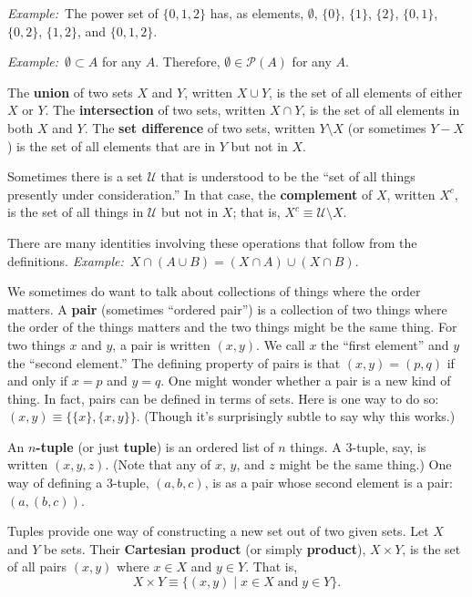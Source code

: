 \documentclass[12pt, a4paper]{article}
\newcommand{\defn}[1]{\textbf{#1}}
\newcommand{\eg}{\emph{Example:}\relax}
\begin{document}
\eg\ The power set of $\{0,1,2\}$ has, as elements, $\emptyset$, $\{0\}$,
$\{1\}$, $\{2\}$, $\{0,1\}$, $\{0,2\}$, $\{1,2\}$, and $\{0,1,2\}$.

\eg\ $\emptyset \subset A$ for any $A$. Therefore, $\emptyset \in \mathcal{P}(A)$ for any $A$. 

The \defn{union} of two sets $X$ and $Y$, written $X \cup Y$, is the set
of all elements of either $X$ or $Y$. The \defn{intersection} of two
sets, written $X \cap Y$, is the set of all elements in both $X$ and
$Y$. The \defn{set difference} of two sets, written $Y \setminus X$ (or
sometimes $Y-X$) is the set of all elements that are in $Y$ but not in
$X$.

Sometimes there is a set $\mathcal{U}$ that is understood to be the “set of all
things presently under consideration.” In that case, the
\defn{complement} of $X$, written $X^c$, is the set of all things in
$\mathcal{U}$ but not in $X$; that is, $X^c \equiv \mathcal{U} \setminus X$.

There are many identities involving these operations that follow from
the definitions.
\eg\ $X\cap(A\cup B) = (X\cap A) \cup (X\cap B)$.

We sometimes do want to talk about collections of things where the
order matters. A \defn{pair} (sometimes “ordered pair”) is a
collection of two things where the order of the things matters and the
two things might be the same thing. For two things $x$ and $y$, a pair
is written $(x, y)$. We call $x$ the “first element” and $y$ the
“second element.” The defining property of pairs is that $(x,y)=(p,q)$
if and only if $x=p$ and $y=q$. One might wonder whether a pair is a
new kind of thing. In fact, pairs can be defined in terms of
sets. Here is one way to do so: $(x, y)\equiv \{\{x\}, \{x,y\}\}$. (Though
it's surprisingly subtle to say why this works.)

An \defn{$n$-tuple} (or just \defn{tuple}) is an ordered list of $n$
things. A 3-tuple, say, is written $(x, y, z)$. (Note that any of $x$,
$y$, and $z$ might be the same thing.) One way of defining a 3-tuple,
$(a, b, c)$, is as a pair whose second element is a pair: $(a, (b,
c))$.
  
Tuples provide one way of constructing a new set out of two given
sets. Let $X$ and $Y$ be sets. Their \defn{Cartesian product} (or
simply \defn{product}), $X \times Y$, is the set of all pairs $(x, y)$
where $x \in X$ and $y \in Y$. That is,
\begin{equation*}
X\times Y\equiv \{(x, y) \mid x\in X\;\text{and}\; y\in Y\}.
\end{equation*}
\end{document}
